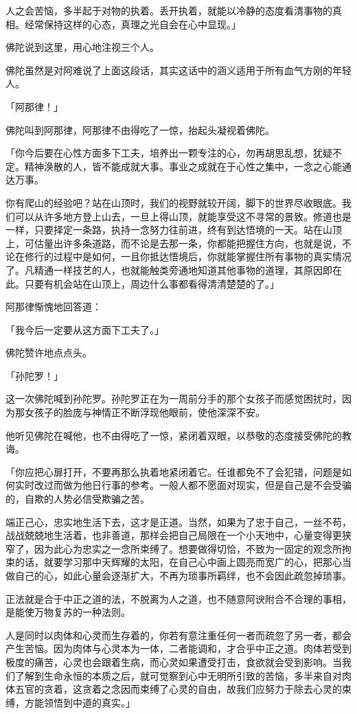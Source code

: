 \documentclass[twoside,openany]{book}
\begin{document}
人之会苦恼，多半起于对物的执着。丢开执着，就能以冷静的态度看清事物的真相。经常保持这样的心态，真理之光自会在心中显现。」

佛陀说到这里，用心地注视三个人。

佛陀虽然是对阿难说了上面这段话，其实这话中的涵义适用于所有血气方刚的年轻人。

「阿那律！」

佛陀叫到阿那律，阿那律不由得吃了一惊，抬起头凝视着佛陀。

「你今后要在心性方面多下工夫，培养出一颗专注的心，勿再胡思乱想，犹疑不定。精神涣散的人，皆不能成就大事。事业之成就在于心性之集中，一念之心能通达万事。

你有爬山的经验吧？站在山顶时，我们的视野就较开阔，脚下的世界尽收眼底。我们可以从许多地方登上山去，一旦上得山顶，就能享受这不寻常的景致。修道也是一样，只要择定一条路，执持一念努力往前进，终有到达悟境的一天。站在山顶上，可估量出许多条道路，而不论是去那一条，你都能把握住方向，也就是说，不论在修行的过程中是如何，一且你抵达悟境后，你就能掌握住所有事物的真实情况了。凡精通一样技艺的人，也就能触类旁通地知道其他事物的道理，其原因即在此。只要有机会站在山顶上，周边什么事都看得清清楚楚的了。」

阿那律惭愧地回答道：

「我今后一定要从这方面下工夫了。」

佛陀赞许地点点头。

「孙陀罗！」

这一次佛陀喊到孙陀罗。孙陀罗正在为一周前分手的那个女孩子而感觉困扰时，因为那女孩子的脸庞与神情正不断浮现他眼前，使他深深不安。

他听见佛陀在喊他，也不由得吃了一惊，紧闭着双眼，以恭敬的态度接受佛陀的教诲。

「你应把心扉打开，不要再那么执着地紧闭着它。任谁都免不了会犯错，问题是如何实时改过而做为他日行事的参考。一般人都不愿面对现实，但是自己是不会受骗的，自欺的人势必信受欺骗之苦。

端正己心，忠实地生活下去，这才是正道。当然，如果为了忠于自己，一丝不苟，战战兢兢地生活着，也非善道，那样会把自己局限在一个小天地中，心量变得更狭窄了，因为此心为忠实之一念所束缚了。想要做得切恰，不致为一固定的观念所拘束的话，就要学习那中天辉耀的太阳，在自己心中画上圆亮而宽广的心，把那心当做自己的心，如此心量会逐渐扩大，不再为琐事所羁绊，也不会因此疏忽掉琐事。

正法就是合于中正之道的法，不脱离为人之道，也不随意阿谀附合不合理的事相，是能使万物复苏的一种法则。

人是同时以肉体和心灵而生存着的，你若有意注重任何一者而疏忽了另一者，都会产生苦恼。因为肉体与心灵本为一体，二者能调和，才合乎中正之道。肉体若受到极度的痛苦，心灵也会跟着生病，而心灵如果遭受打击，食欲就会受到影响。当我们了解到生命永恒的本质之后，就可觉察到心中无明所引致的苦恼，多半来自对肉体五官的贪着，这贪着之念因而束缚了心灵的自由，故我们应努力于除去心灵的束缚，方能领悟到中道的真实。」
\end{document}

